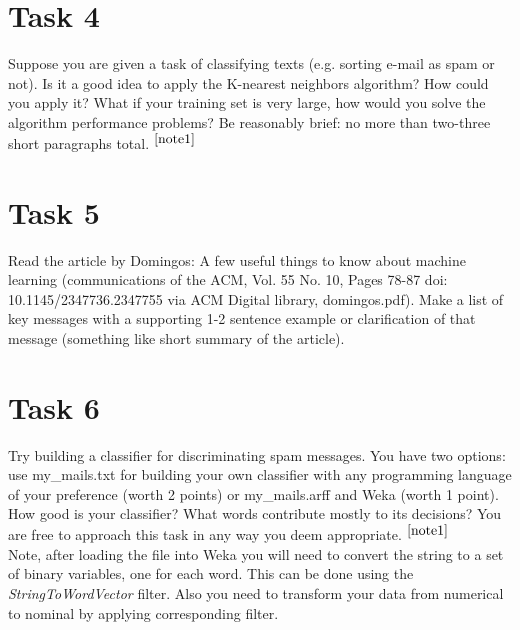 \documentclass{article}
\newcommand{\footref}[1]{%
    $^{\ref{#1}}$%
}
\begin{document}
\section*{Task 4}
Suppose you are given a task of classifying texts (e.g. sorting e-mail as spam or not). Is it a good idea to apply the K-nearest neighbors algorithm? How could you apply it? What if your training set is very large, how would you solve the algorithm performance problems?
Be reasonably brief: no more than two-three short paragraphs total.\footref{note1}

\section*{Task 5}
Read the article by Domingos: A few useful things to know about machine learning (communications of the ACM, Vol. 55 No. 10, Pages 78-87 doi: 10.1145/2347736.2347755 via ACM Digital library, domingos.pdf). Make a list of key messages with a supporting 1-2 sentence example or clarification of that message (something like short summary of the article).


\section*{Task 6}
Try building a classifier for discriminating spam messages. You have two options: use my\_mails.txt for building your own classifier with any programming language of your preference (worth 2 points) or my\_mails.arff and Weka (worth 1 point). How good is your classifier? What words contribute mostly to its decisions? You are free to approach this task in any way you deem appropriate.\footref{note1}\\

Note, after loading the file into Weka you will need to convert the string to a set of binary variables, one for each word. This can be done using the \emph{StringToWordVector} filter. Also you need to transform your data from numerical to nominal by applying corresponding filter. 
\end{document}
